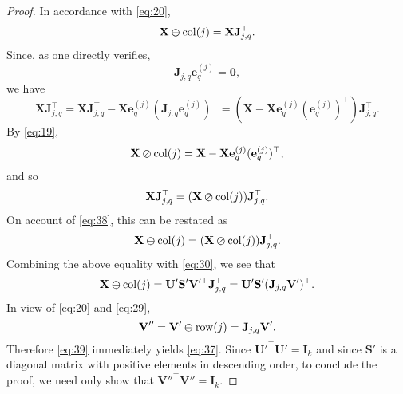 \documentclass[11pt,a4paper]{article}
\theoremstyle{break}
\numberwithin{dummy}{section}
\theoremstyle{plain}
\theoremstyle{plain}
\theoremstyle{plain}
\theoremstyle{plain}
\theoremstyle{plain}
\theoremstyle{MyNonumberplain}
\newtheorem{proof}{Proof}
\newcommand{\0}{\M{0}}
\newcommand{\M}[1]{\mathbf{#1}}
\newcommand{\T}{\top}
\newcommand{\eve}[2]{\mathbf{e}^{(#1)}_{#2}}
\newcommand{\delcol}[2]{\M{#1} \varominus {\mathrm{col}}({#2})}
\newcommand{\delrow}[2]{\M{#1} \varominus \mathrm{row}(#2)}
\newcommand{\sel}[2]{\M{J}_{#1,#2}}
\newcommand{\zercol}[2]{\M{#1} \varoslash \mathrm{col}(#2)}
\begin{document}
\begin{proof}
  In accordance with \eqref{eq:20},
  \begin{equation}
    \label{eq:38}
    \delcol{X}{j} = \M{X} \sel{j}{q}^\T.
  \end{equation}
  Since, as one directly verifies,
  \begin{displaymath}
    \sel{j}{q} \eve{j}{q} = \0,
  \end{displaymath}
  we have
  \begin{displaymath}
    \M{X} \sel{j}{q}^\T
    =
    \M{X} \sel{j}{q}^\T
    - \M{X} \eve{j}{q} (\sel{j}{q} \eve{j}{q})^\T
    = 
    (\M{X} - \M{X} \eve{j}{q} (\eve{j}{q})^\T ) \sel{j}{q}^\T.
  \end{displaymath}
  By \eqref{eq:19},
  \begin{displaymath}
    \zercol{X}{j} = \M{X} - \M{X} \eve{j}{q} (\eve{j}{q})^\T,
  \end{displaymath}
  and so
  \begin{displaymath}
    \M{X} \sel{j}{q}^\T =  (\zercol{X}{j}) \sel{j}{q}^\T.
  \end{displaymath}
  On account of \eqref{eq:38}, this can be restated as
  \begin{displaymath}
    \delcol{X}{j} = (\zercol{X}{j}) \sel{j}{q}^\T.
  \end{displaymath}
  Combining the above equality with \eqref{eq:30}, we see that
  \begin{equation}
    \label{eq:39}
    \delcol{X}{j} = \M{U}' \M{S}' \M{V}'^\T \sel{j}{q}^\T
    = \M{U}' \M{S}'
    (\sel{j}{q} \M{V}')^\T.
  \end{equation}
  In view of \eqref{eq:20} and \eqref{eq:29},
  \begin{displaymath}
    \M{V}'' = \delrow{V'}{j} = \sel{j}{q} \M{V}'.
  \end{displaymath}
  Therefore \eqref{eq:39} immediately yields \eqref{eq:37}. Since
  \begin{math}
    \M{U}'^\T \M{U}' = \M{I}_k
  \end{math}
  and since $\M{S}'$ is a diagonal matrix with positive elements in descending order, to conclude the proof, we need only show that
  \begin{math}
    \M{V}''^\T \M{V}'' = \M{I}_k.
  \end{math}


\end{proof}
\end{document}
